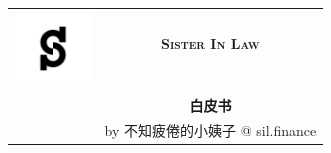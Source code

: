 \documentclass[11pt,letterpaper]{article}
\begin{document}
\sloppy     %
\begin{center}
\begin{tabular}{cc}
\multirow{2}{3.5cm}{\includegraphics[width=2cm]{img/White_icon.png}}	& \huge{\textsc{\textbf{Sister In Law}}}\\ %
 & \\ [3mm]
 & \Large{\textsf{\textbf{白皮书}}}\\ [2mm]
 & \small{by 不知疲倦的小姨子} @ sil.finance
\end{tabular}
\end{center}
\end{document}
